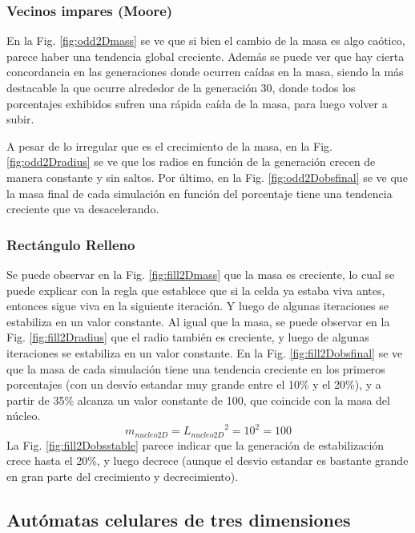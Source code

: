 \subsubsection{Vecinos impares (Moore)}
En la Fig. \ref{fig:odd2Dmass} se ve que si bien el cambio de la masa es algo caótico, parece haber una tendencia global creciente.
Además se puede ver que hay cierta concordancia en las generaciones donde ocurren caídas en la masa, siendo la más destacable la que ocurre alrededor de la generación 30, donde todos los porcentajes exhibidos sufren una rápida caída de la masa, para luego volver a subir.

A pesar de lo irregular que es el crecimiento de la masa, en la Fig. \ref{fig:odd2Dradius} se ve que los radios en función de la generación crecen de manera constante y sin saltos.
Por último, en la Fig. \ref{fig:odd2Dobsfinal} se ve que la masa final de cada simulación en función del porcentaje tiene una tendencia creciente que va desacelerando.

\subsubsection{Rectángulo Relleno}
Se puede observar en la Fig. \ref{fig:fill2Dmass} que la masa es creciente, lo cual se puede explicar con la regla que establece que si la celda ya estaba viva antes, entonces sigue viva en la siguiente iteración.
Y luego de algunas iteraciones se estabiliza en un valor constante.
Al igual que la masa, se puede observar en la Fig. \ref{fig:fill2Dradius} que el radio también es creciente, y luego de algunas iteraciones se estabiliza en un valor constante.
En la Fig. \ref{fig:fill2Dobsfinal} se ve que la masa de cada simulación tiene una tendencia creciente en los primeros porcentajes (con un desvío estandar muy grande entre el 10\% y el 20\%), y a partir de 35\% alcanza un valor constante de 100,
que coincide con la masa del núcleo.
\begin{equation}
    m_{nucleo2D} = {L_{nucleo2D}}^2 = 10^2 = 100
\end{equation}
La Fig. \ref{fig:fill2Dobsstable} parece indicar que la generación de estabilización crece hasta el 20\%, y luego decrece (aunque el desvio estandar es bastante grande en gran parte del crecimiento y decrecimiento).


\subsection{Autómatas celulares de tres dimensiones}
\label{subsec:results3d}

